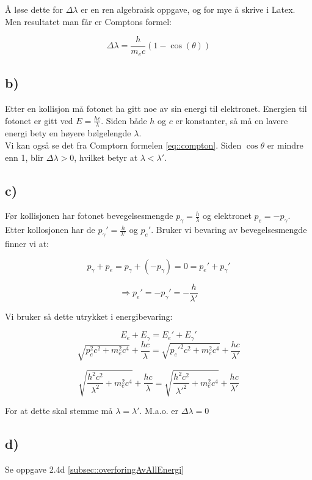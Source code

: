 \documentclass[a4paper,norsk, 10pt]{article}
\begin{document}
Å løse dette for $\Delta \lambda$ er en ren algebraisk oppgave, og for mye å skrive i Latex. Men resultatet man får er Comptons formel:

\begin{equation}
\Delta \lambda = \frac{h}{m_ec}(1-\cos(\theta))
\end{equation}\label{eq::compton}


\subsection*{b)}

Etter en kollisjon må fotonet ha gitt noe av sin energi til elektronet. Energien til fotonet er gitt ved $E = \frac{hc}{\lambda}$. Siden både $h$ og $c$ er konstanter, så må en lavere energi bety en høyere bølgelengde $\lambda$.\\

Vi kan også se det fra Comptorn formelen \ref{eq::compton}. Siden $\cos\theta$ er mindre enn 1, blir $\Delta \lambda > 0$, hvilket betyr at $\lambda < \lambda'$.

\subsection*{c)}
Før kollisjonen har fotonet bevegelsesmengde $p_{\gamma} = \frac{h}{\lambda}$ og elektronet $p_e = - p_{\gamma}$. Etter kollosjonen har de $p_{\gamma}' = \frac{h}{\lambda'}$ og $p_e'$. Bruker vi bevaring av bevegelsesmengde finner vi at:

$$
p_{\gamma} + p_e = p_{\gamma} + (-p_{\gamma}) = 0 = p_e' + p_{\gamma}'
$$

$$
\Rightarrow p_e' = - p_{\gamma}' = -\frac{h}{\lambda'}
$$

Vi bruker så dette utrykket i energibevaring:

$$
E_e + E_{\gamma} = E_e' + E_{\gamma}'
$$
$$
\sqrt{p_e^2c^2 + m_e^2c^4} + \frac{hc}{\lambda} = \sqrt{p_e'^2c^2 + m_e^2c^4} + \frac{hc}{\lambda'}
$$

$$
\sqrt{\frac{h^2c^2}{\lambda^2} + m_e^2c^4} + \frac{hc}{\lambda} = \sqrt{\frac{h^2c^2}{\lambda'^2} + m_e^2c^4} + \frac{hc}{\lambda'}
$$

For at dette skal stemme må $\lambda = \lambda'$. M.a.o. er $\Delta \lambda = 0$

\subsection*{d)}
Se oppgave 2.4d \ref{subsec::overforingAvAllEnergi}
\end{document}
